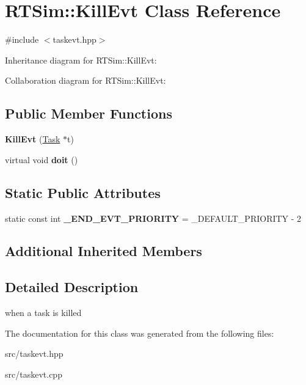 \hypertarget{classRTSim_1_1KillEvt}{}\section{R\+T\+Sim\+:\+:Kill\+Evt Class Reference}
\label{classRTSim_1_1KillEvt}


{\ttfamily \#include $<$taskevt.\+hpp$>$}



Inheritance diagram for R\+T\+Sim\+:\+:Kill\+Evt\+:


Collaboration diagram for R\+T\+Sim\+:\+:Kill\+Evt\+:
\subsection*{Public Member Functions}
\begin{DoxyCompactItemize}
\item 
{\bfseries Kill\+Evt} (\hyperlink{classRTSim_1_1Task}{Task} $\ast$t)
\item 
virtual void {\bfseries doit} ()
\end{DoxyCompactItemize}
\subsection*{Static Public Attributes}
\begin{DoxyCompactItemize}
\item 
static const int {\bfseries \+\_\+\+E\+N\+D\+\_\+\+E\+V\+T\+\_\+\+P\+R\+I\+O\+R\+I\+TY} = \+\_\+\+D\+E\+F\+A\+U\+L\+T\+\_\+\+P\+R\+I\+O\+R\+I\+TY -\/ 2
\end{DoxyCompactItemize}
\subsection*{Additional Inherited Members}


\subsection{Detailed Description}
when a task is killed 

The documentation for this class was generated from the following files\+:\begin{DoxyCompactItemize}
\item 
src/taskevt.\+hpp\item 
src/taskevt.\+cpp\end{DoxyCompactItemize}
